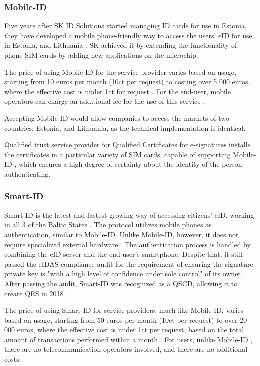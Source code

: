 \subsubsection{Mobile-ID}

Five years after SK ID Solutions started managing ID cards for use in Estonia, they have developed a mobile phone-friendly way to access the users' eID for use in Estonia, and Lithuania \cite{sk-history2007}. SK achieved it by extending the functionality of phone SIM cards by adding new applications on the microchip.

The price of using Mobile-ID for the service provider varies based on usage, starting from 10 euros per month (10ct per request) to costing over 5 000 euros, where the effective cost is under 1ct for request \cite{sk-mobileidpricing}. For the end-user, mobile operators can charge an additional fee for the use of this service \cite{telia-mobileid}.

Accepting Mobile-ID would allow companies to access the markets of two countries: Estonia, and Lithuania, as the technical implementation is identical.

Qualified trust service provider for Qualified Certificates for e-signatures installs the certificates in a particular variety of SIM cards, capable of supporting Mobile-ID \cite{eu-trustservices}, which ensures a high degree of certainty about the identity of the person authenticating.


\subsubsection{Smart-ID}

Smart-ID is the latest and fastest-growing way of accessing citizens' eID, working in all 3 of the Baltic States \cite{sk-history2017}. The protocol utilizes mobile phones as authentication, similar to Mobile-ID. Unlike Mobile-ID, however, it does not require specialized external hardware \cite{smartid-docs}. The authentication process is handled by combining the eID server and the end user's smartphone. Despite that, it still passed the eIDAS compliance audit for the requirement of ensuring the signature private key is "with a high level of confidence under sole control" of its owner \cite{enisa-eidasreq}. After passing the audit, Smart-ID was recognized as a QSCD, allowing it to create QES in 2018 \cite{smartid-qscd}.

The price of using Smart-ID for service providers, much like Mobile-ID, varies based on usage, starting from 50 euros per month (10ct per request) to over 20 000 euros, where the effective cost is under 1ct per request, based on the total amount of transactions performed within a month \cite{sk-smartidpricing}. For users, unlike Mobile-ID \cite{telia-mobileid}, there are no telecommunication operators involved, and there are no additional costs.

